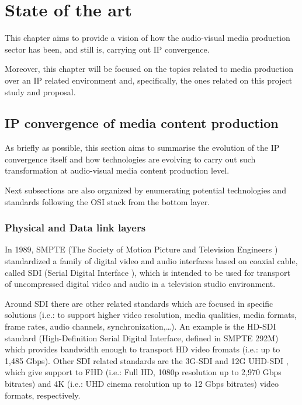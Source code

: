\chapter{State of the art}\label{A:stateOfTheArt}

This chapter aims to provide a vision of how the audio-visual media production sector has been, and still is, carrying out IP convergence. 

Moreover, this chapter will be focused on the topics related to media production over an IP related environment and, specifically, the ones related on this project study and proposal.

\section{IP convergence of media content production}

As briefly as possible, this section aims to summarise the evolution of the IP convergence itself and how technologies are evolving to carry out such transformation at audio-visual media content production level.

Next subsections are also organized by enumerating potential technologies and standards following the OSI \cite{osi} stack from the bottom layer.

\subsection{Physical and Data link layers}

In 1989, SMPTE (The Society of Motion Picture and Television Engineers \cite{smpte}) standardized a family of digital video and audio interfaces based on coaxial cable, called SDI (Serial Digital Interface \cite{SDI}), which is intended to be used for transport of uncompressed digital video and audio in a television studio environment. 

Around SDI there are other related standards which are focused in specific solutions (i.e.: to support higher video resolution, media qualities, media formats, frame rates, audio channels, synchronization,\ldots). An example is the HD-SDI \cite{SDI} standard (High-Definition Serial Digital Interface, defined in SMPTE 292M) which provides bandwidth enough to transport HD video fromats (i.e.: up to 1,485 Gbps). Other SDI related standards are the 3G-SDI \cite{3GSDI} and 12G UHD-SDI \cite{UHDSDI}, which give support to FHD (i.e.: Full HD, 1080p resolution up to 2,970 Gbps bitrates) and 4K (i.e.: UHD cinema resolution up to 12 Gbps bitrates) video formats, respectively. 


